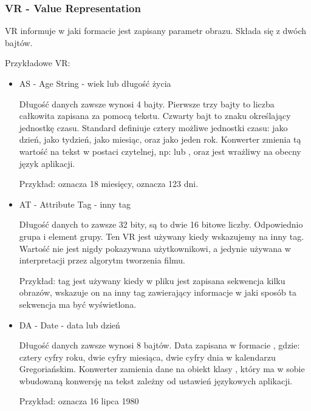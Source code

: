 \subsubsection{VR - Value Representation}
\label{sec:dicom-vr}

VR informuje w jaki formacie jest zapisany parametr obrazu.
Składa się z dwóch bajtów.

Przykładowe VR:
\begin{itemize}
    \item AS - Age String - wiek lub długość życia

    Długość danych zawsze wynosi 4 bajty.
    Pierwsze trzy bajty to liczba całkowita zapisana za pomocą tekstu.
    Czwarty bajt to znaku określający jednostkę czasu.
    Standard definiuje cztery możliwe jednostki czasu:  jako dzień,  jako tydzień,  jako miesiąc, oraz  jako jeden rok.
    Konwerter zmienia tą wartość na tekst w postaci czytelnej, np:  lub , oraz jest wrażliwy na obecny język aplikacji.
    
    Przykład:  oznacza 18 miesięcy,  oznacza 123 dni.

    \item AT - Attribute Tag - inny tag

    Długość danych to zawsze 32 bity, są to dwie 16 bitowe liczby.
    Odpowiednio grupa i element grupy.
    Ten VR jest używany kiedy wskazujemy na inny tag.
    Wartość nie jest nigdy pokazywana użytkownikowi, a jedynie używana w interpretacji przez algorytm tworzenia filmu.
    
    Przykład: tag  jest używany kiedy w pliku jest zapisana sekwencja kilku obrazów, wskazuje on na inny tag zawierający informacje w jaki sposób ta sekwencja ma być wyświetlona.
    
    \item DA - Date - data lub dzień

    Długość danych zawsze wynosi 8 bajtów.
    Data zapisana w formacie , gdzie:  cztery cyfry roku,  dwie cyfry miesiąca,  dwie cyfry dnia w kalendarzu Gregoriańskim.
    Konwerter zamienia dane na obiekt klasy , który ma w sobie wbudowaną konwersję na tekst zależny od ustawień językowych aplikacji.
    
    Przykład:  oznacza 16 lipca 1980
    

\end{itemize}
